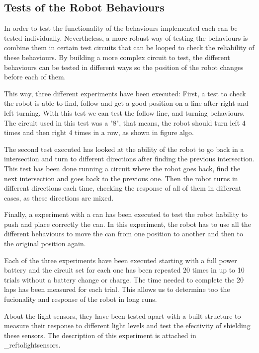 
\subsection{Tests of the Robot Behaviours}
In order to test the functionality of the behaviours implemented each can be tested individually.
Nevertheless, a more robust way of testing the behaviours is combine them in certain test circuits that can be looped to check the reliability of these behaviours.
By building a more complex circuit to test, the different behaviours can be tested in different ways so the position of the robot changes before each of them.

This way, three different experiments have been executed:
First, a test to check the robot is able to find, follow and get a good position on a line after right and left turning. 
With this test we can test the follow line, and turning behaviours.
The circuit used in this test was a "8", that means, the robot should turn left 4 times and then right 4 times in a row, 
as shown in figure algo.

The second test executed has looked at the ability of the robot to go back in a intersection and turn to different directions after finding the previous intersection.
This test has been done running a circuit where the robot goes back, find the next intersection and goes back to the previous one. 
Then the robot turns in different directions each time, checking the response of all of them in different cases, as these directions are mixed.

Finally, a experiment with a can has been executed to test the robot hability to push and place correctly the can.
In this experiment, the robot has to use all the different behaviours to move the can from one position to another and then to the original position again.

Each of the three experiments have been executed starting with a full power battery and the circuit set for each one has been repeated 20 times in up to 10 trials without a battery change or charge.
The time needed to complete the 20 laps has been measured for each trial.
This allows us to determine too the fucionality and response of the robot in long runs.

About the light sensors, they have been tested apart with a built structure to measure their response to different light levels and test the efectivity of shielding these sensors.
The description of this experiment is attached in \_reftolightsensors.



